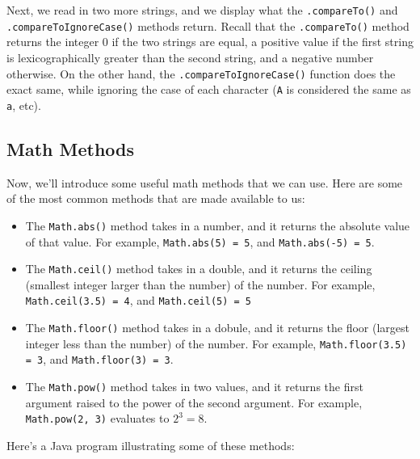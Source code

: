 Next, we read in two more strings, and we display what the \verb!.compareTo()! and \verb!.compareToIgnoreCase()! methods return. Recall that the \verb!.compareTo()! method returns the integer $0$ if the two strings are equal, a positive value if the first string is lexicographically greater than the second string, and a negative number otherwise. On the other hand, the \verb!.compareToIgnoreCase()! function does the exact same, while ignoring the case of each character (\verb!A! is considered the same as \verb!a!, etc). \\

\subsection{Math Methods}

Now, we'll introduce some useful math methods that we can use. Here are some of the most common methods that are made available to us:

\begin{itemize}
    \item The \verb!Math.abs()! method takes in a number, and it returns the absolute value of that value. For example, \verb!Math.abs(5) = 5!, and \verb!Math.abs(-5) = 5!. 
    \item The \verb!Math.ceil()! method takes in a double, and it returns the ceiling (smallest integer larger than the number) of the number. For example, \verb!Math.ceil(3.5) = 4!, and \verb!Math.ceil(5) = 5!
    \item The \verb!Math.floor()! method takes in a dobule, and it returns the floor (largest integer less than the number) of the number. For example, \verb!Math.floor(3.5) = 3!, and \verb!Math.floor(3) = 3!. 
    \item The \verb!Math.pow()! method takes in two values, and it returns the first argument raised to the power of the second argument. For example, \verb!Math.pow(2, 3)! evaluates to $2^{3} = 8$. 
\end{itemize}


\noindent Here's a Java program illustrating some of these methods:

